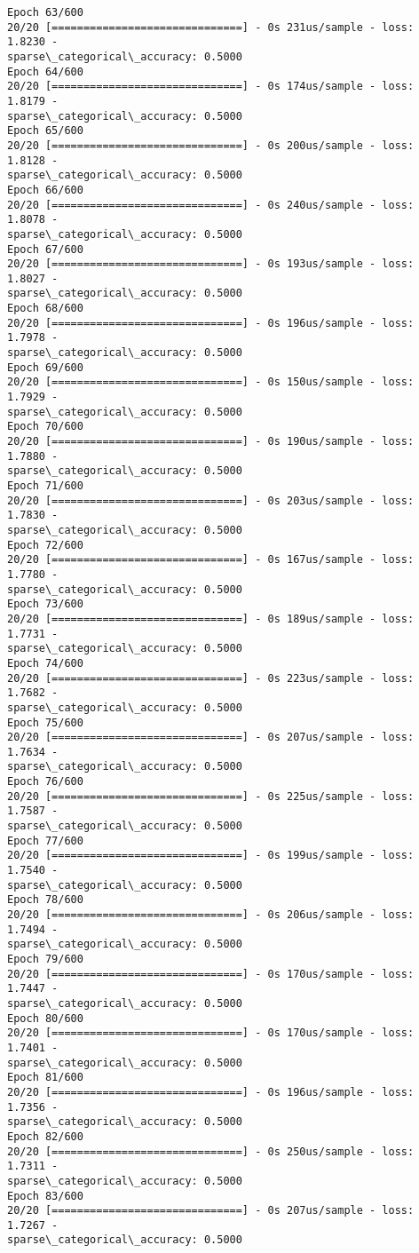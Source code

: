 \documentclass[11pt]{article}
\begin{document}
\begin{Verbatim}[commandchars=\\\{\}]
Epoch 63/600
20/20 [==============================] - 0s 231us/sample - loss: 1.8230 -
sparse\_categorical\_accuracy: 0.5000
Epoch 64/600
20/20 [==============================] - 0s 174us/sample - loss: 1.8179 -
sparse\_categorical\_accuracy: 0.5000
Epoch 65/600
20/20 [==============================] - 0s 200us/sample - loss: 1.8128 -
sparse\_categorical\_accuracy: 0.5000
Epoch 66/600
20/20 [==============================] - 0s 240us/sample - loss: 1.8078 -
sparse\_categorical\_accuracy: 0.5000
Epoch 67/600
20/20 [==============================] - 0s 193us/sample - loss: 1.8027 -
sparse\_categorical\_accuracy: 0.5000
Epoch 68/600
20/20 [==============================] - 0s 196us/sample - loss: 1.7978 -
sparse\_categorical\_accuracy: 0.5000
Epoch 69/600
20/20 [==============================] - 0s 150us/sample - loss: 1.7929 -
sparse\_categorical\_accuracy: 0.5000
Epoch 70/600
20/20 [==============================] - 0s 190us/sample - loss: 1.7880 -
sparse\_categorical\_accuracy: 0.5000
Epoch 71/600
20/20 [==============================] - 0s 203us/sample - loss: 1.7830 -
sparse\_categorical\_accuracy: 0.5000
Epoch 72/600
20/20 [==============================] - 0s 167us/sample - loss: 1.7780 -
sparse\_categorical\_accuracy: 0.5000
Epoch 73/600
20/20 [==============================] - 0s 189us/sample - loss: 1.7731 -
sparse\_categorical\_accuracy: 0.5000
Epoch 74/600
20/20 [==============================] - 0s 223us/sample - loss: 1.7682 -
sparse\_categorical\_accuracy: 0.5000
Epoch 75/600
20/20 [==============================] - 0s 207us/sample - loss: 1.7634 -
sparse\_categorical\_accuracy: 0.5000
Epoch 76/600
20/20 [==============================] - 0s 225us/sample - loss: 1.7587 -
sparse\_categorical\_accuracy: 0.5000
Epoch 77/600
20/20 [==============================] - 0s 199us/sample - loss: 1.7540 -
sparse\_categorical\_accuracy: 0.5000
Epoch 78/600
20/20 [==============================] - 0s 206us/sample - loss: 1.7494 -
sparse\_categorical\_accuracy: 0.5000
Epoch 79/600
20/20 [==============================] - 0s 170us/sample - loss: 1.7447 -
sparse\_categorical\_accuracy: 0.5000
Epoch 80/600
20/20 [==============================] - 0s 170us/sample - loss: 1.7401 -
sparse\_categorical\_accuracy: 0.5000
Epoch 81/600
20/20 [==============================] - 0s 196us/sample - loss: 1.7356 -
sparse\_categorical\_accuracy: 0.5000
Epoch 82/600
20/20 [==============================] - 0s 250us/sample - loss: 1.7311 -
sparse\_categorical\_accuracy: 0.5000
Epoch 83/600
20/20 [==============================] - 0s 207us/sample - loss: 1.7267 -
sparse\_categorical\_accuracy: 0.5000

\end{Verbatim}
\end{document}
